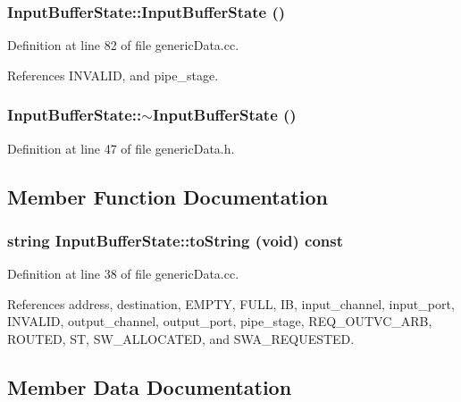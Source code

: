 \subsubsection[{InputBufferState}]{\setlength{\rightskip}{0pt plus 5cm}InputBufferState::InputBufferState ()}\label{classInputBufferState_4f448a545347e70b0d59888ab390e928}




Definition at line 82 of file genericData.cc.

References INVALID, and pipe\_\-stage.
\subsubsection[{$\sim$InputBufferState}]{\setlength{\rightskip}{0pt plus 5cm}InputBufferState::$\sim$InputBufferState ()\hspace{0.3cm}{\tt  [inline]}}\label{classInputBufferState_43810f0c5db220a4b477b5012735b1a6}




Definition at line 47 of file genericData.h.

\subsection{Member Function Documentation}
\subsubsection[{toString}]{\setlength{\rightskip}{0pt plus 5cm}string InputBufferState::toString (void) const}\label{classInputBufferState_940a82fa92b2aaba595657eec3b598de}




Definition at line 38 of file genericData.cc.

References address, destination, EMPTY, FULL, IB, input\_\-channel, input\_\-port, INVALID, output\_\-channel, output\_\-port, pipe\_\-stage, REQ\_\-OUTVC\_\-ARB, ROUTED, ST, SW\_\-ALLOCATED, and SWA\_\-REQUESTED.

\subsection{Member Data Documentation}
